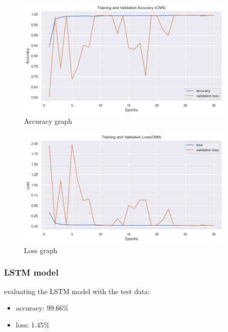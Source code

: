 		\begin{figure}[h]
			\centering
			\includegraphics[width=400px]{figures/CNN_training_validation.png}
			\caption{Accuracy graph}
			\label{fig:aa}
		\end{figure}
		\begin{figure}[h]
			\centering
			\includegraphics[width=400px]{figures/CNN_training_validation_loss.png}
			\caption{Loss graph}
			\label{fig:ff}
		\end{figure}
		


\subsubsection{LSTM model}


evaluating the LSTM model with the test data:
\firmlist
		\begin{itemize}
			\item accuracy: 99.66\%
			\item loss: 1.45\%
		\end{itemize}



